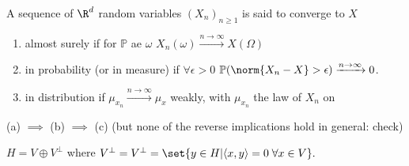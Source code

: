 \documentclass{article}
\newcommand{\1}[1]{\mathbbm{1}_{#1}}
\begin{document}
\begin{defi}
    A sequence of $\R^d$ random variables $(X_n)_{n \geq 1}$ is said to converge to $X$
    \begin{enumerate}[label=(\alph*)]
        \item almost surely if for $\mathbb{P}$ ae $\omega$ $X_n(\omega) \xrightarrow{n \to \infty} X(\Omega)$
        \item in probability (or in measure) if $\forall \epsilon > 0$ $\mathbb{P}(\norm{X_n - X} > \epsilon) \xrightarrow{n \to \infty} 0$.
        \item in distribution if $\mu_{x_n} \xrightarrow{n \to \infty} \mu_x$ weakly, with $\mu_{x_n}$ the law of $X_n$ on
    \end{enumerate}
\end{defi}

\begin{remark}
    (a) $\implies$ (b) $\implies$ (c) (but none of the reverse implications hold in general: check)

\end{remark}


\begin{cor}
    $H = V \oplus V^\bot$ where $V^\bot = V^\bot = \set{y \in H| \langle x, y\rangle = 0 \; \forall x \in V}.$
\end{cor}
\end{document}
